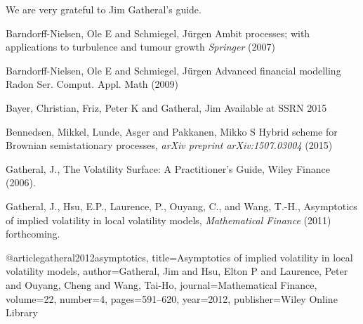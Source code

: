 \documentclass[12pt]{article}
\numberwithin{equation}{section}
\begin{document}
We are very grateful to Jim Gatheral's guide.

%
%
%
%

\begin{thebibliography}{}

{Barndorff-Nielsen, Ole E} and {Schmiegel, J{\"u}rgen}
{Ambit processes; with applications to turbulence and tumour growth}
{\it Springer} (2007)

{Barndorff-Nielsen, Ole E} and {Schmiegel, J{\"u}rgen}
{Advanced financial modelling}
{Radon Ser. Comput. Appl. Math} (2009)

{Bayer, Christian}, {Friz, Peter K} and {Gatheral, Jim}
{Available at SSRN}
{2015}

{Bennedsen, Mikkel}, {Lunde, Asger} and {Pakkanen, Mikko S}
{Hybrid scheme for Brownian semistationary processes},
{\it arXiv preprint arXiv:1507.03004} (2015)

 { Gatheral, J.},
{The Volatility Surface: A Practitioner's Guide},
{Wiley Finance} (2006).

{ Gatheral, J.}, { Hsu, E.P.}, { Laurence, P.}, { Ouyang, C.}, and { Wang, T.-H.},
{Asymptotics of implied volatility in local volatility models},
{\it Mathematical Finance} (2011) forthcoming.

@article{gatheral2012asymptotics,
  title={Asymptotics of implied volatility in local volatility models},
  author={Gatheral, Jim and Hsu, Elton P and Laurence, Peter and Ouyang, Cheng and Wang, Tai-Ho},
  journal={Mathematical Finance},
  volume={22},
  number={4},
  pages={591--620},
  year={2012},
  publisher={Wiley Online Library}
}

\end{thebibliography}
\end{document}

